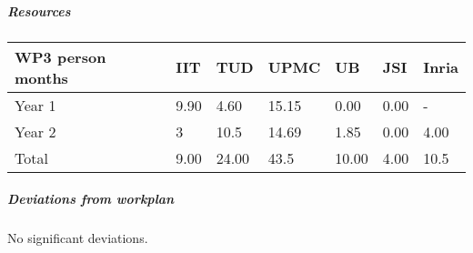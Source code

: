 
\subparagraph{Resources}

\begin{center}
\begin{tabular}{|C{2cm}|C{2cm}|C{2cm}|C{2cm}|C{2cm}|C{2cm}|C{2cm}|}
\hline
\footnotesize \textbf{WP3 person months}& \footnotesize \textbf{IIT}&\footnotesize \textbf{TUD}&\footnotesize \textbf{UPMC}& \footnotesize \textbf{UB} &\footnotesize \textbf{JSI} &\footnotesize \textbf{Inria}\\ \hline
\footnotesize Year 1 &  9.90 & 4.60 & 15.15 & 0.00 & 0.00 &  -   \\  \hline
\footnotesize Year 2 &  3 & 10.5 & 14.69 & 1.85 & 0.00 &  4.00  \\  \hline
\footnotesize Total &  9.00	 & 24.00 & 43.5 & 10.00 & 4.00 & 10.5 \\ \hline
\end{tabular}
\end{center}

\subparagraph{Deviations from workplan} 
No significant deviations. 

